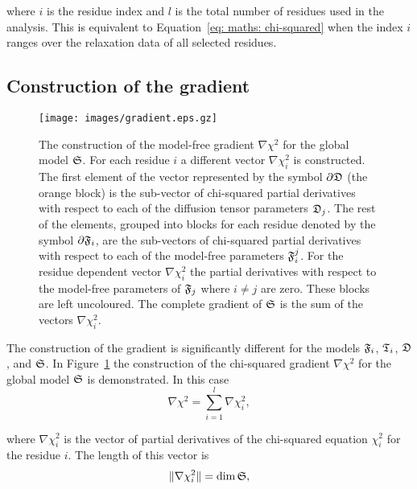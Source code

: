 \noindent where $i$ is the residue index and $l$ is the total number of residues used in the analysis.  This is equivalent to Equation~\eqref{eq: maths: chi-squared} when the index $i$ ranges over the relaxation data of all selected residues.




\subsection{Construction of the gradient}

\begin{figure}
\centerline{\texttt{[image: images/gradient.eps.gz]}}
\caption[The construction of the model-free gradient.]{The construction of the model-free gradient $\nabla \chi^2$ for the global model $\mathfrak{S}$.  For each residue $i$ a different vector $\nabla \chi^2_i$ is constructed.  The first element of the vector represented by the symbol $\partial \mathfrak{D}$ (the orange block) is the sub-vector of chi-squared partial derivatives with respect to each of the diffusion tensor parameters $\mathfrak{D}_j$.  The rest of the elements, grouped into blocks for each residue denoted by the symbol $\partial \mathfrak{F}_i$, are the sub-vectors of chi-squared partial derivatives with respect to each of the model-free parameters $\mathfrak{F}_i^j$.  For the residue dependent vector $\nabla \chi^2_i$ the partial derivatives with respect to the model-free parameters of $\mathfrak{F}_j$ where $i \ne j$ are zero.  These blocks are left uncoloured.  The complete gradient of $\mathfrak{S}$ is the sum of the vectors $\nabla \chi^2_i$.}\label{fig: gradient construction}
\end{figure}

The construction of the gradient is significantly different for the models $\mathfrak{F}_i$, $\mathfrak{T}_i$, $\mathfrak{D}$, and $\mathfrak{S}$.  In Figure~\ref{fig: gradient construction} the construction of the chi-squared gradient $\nabla \chi^2$ for the global model $\mathfrak{S}$ is demonstrated.  In this case
\begin{equation} \label{eq: spaceset gradient}
    \nabla \chi^2 = \sum_{i=1}^l \nabla \chi^2_i,
\end{equation}

\noindent where $\nabla \chi^2_i$ is the vector of partial derivatives of the chi-squared equation $\chi^2_i$ for the residue $i$.  The length of this vector is
\begin{equation}
    \lVert \nabla \chi^2_i \rVert = \dim \mathfrak{S},
\end{equation}

